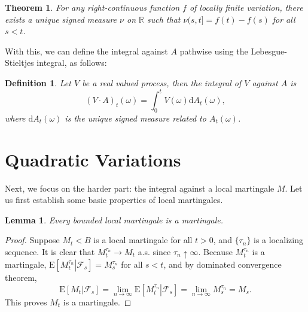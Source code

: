 \documentclass[10pt,twocolumn]{article}
\newtheorem{definition}{Definition}
\newtheorem{lemma}{Lemma}
\newtheorem{theorem}{Theorem}
\newcommand{\diff}[1]{\mathrm{d}#1}
\newcommand{\condexpect}[2]{\mathrm{E}\left[\left.#1\right|#2\right]}
\begin{document}
\begin{theorem}
	For any right-continuous function $f$ of locally finite variation, there exists a unique signed measure $\nu$ on $\mathbb{R}$ such that $\nu(s,t] = f(t)-f(s)$ for all $s<t$.
\end{theorem}

With this, we can define the integral against $A$ pathwise using the Lebesgue-Stieltjes integral, as follows:
\begin{definition}
	Let $V$ be a real valued process, then the integral of $V$ against $A$ is
	\begin{equation}
	(V \cdot A)_t(\omega) = \int_0^t V(\omega) \diff{A_t(\omega)},
	\end{equation}
	where $\diff{A_t(\omega)}$ is the unique signed measure related to $A_t(\omega)$.
\end{definition}


\section{Quadratic Variations}

Next, we focus on the harder part: the integral against a local martingale $M$.
Let us first establish some basic properties of local martingales.
\begin{lemma}
	Every bounded local martingale is a martingale.
\end{lemma}
\begin{proof}
	Suppose $M_t<B$ is a local martingale for all $t>0$, and $\{\tau_n\}$ is a localizing sequence.
	It is clear that $M_t^{\tau_n} \to M_t$ a.s. since $\tau_n\uparrow\infty$.
	Because $M_t^{\tau_n}$ is a martingale, $\condexpect{M_t^{\tau_n}}{\mathcal{F}_s} = M_s^{\tau_n}$ for all $s<t$, and by dominated convergence theorem,
	\begin{equation}
		\condexpect{M_t}{\mathcal{F}_s} = \lim\limits_{n\to\infty}\condexpect{M_t^{\tau_n}}{\mathcal{F}_s} = \lim\limits_{n\to\infty}M_s^{\tau_n} = M_s.
	\end{equation}
	This proves $M_t$ is a martingale.
\end{proof}
\end{document}
